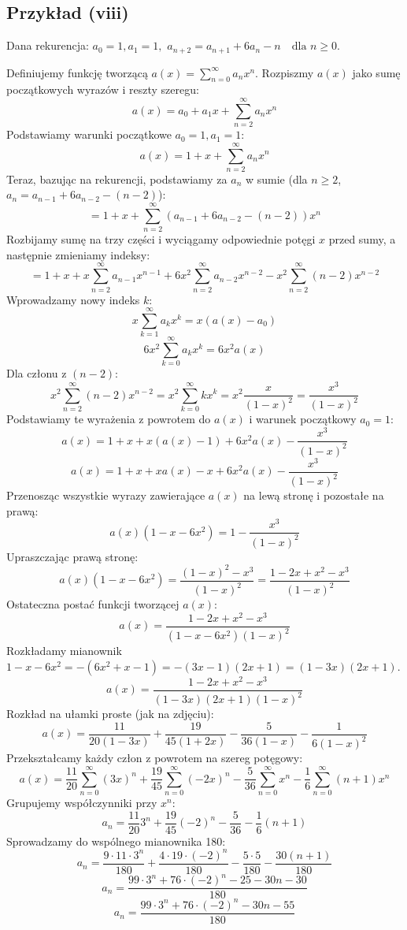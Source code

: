 \documentclass{mwart}
\begin{document}
\begin{mdframed}
    \subsection*{Przykład (viii)}
Dana rekurencja:
$a_0 = 1, a_1 = 1,$
$a_{n+2} = a_{n+1} + 6a_n - n \quad \text{dla } n \ge 0.$

Definiujemy funkcję tworzącą $a(x) = \sum_{n=0}^{\infty} a_n x^n$.
Rozpiszmy $a(x)$ jako sumę początkowych wyrazów i reszty szeregu:
$$ a(x) = a_0 + a_1 x + \sum_{n=2}^{\infty} a_n x^n $$
Podstawiamy warunki początkowe $a_0 = 1, a_1 = 1$:
$$ a(x) = 1 + x + \sum_{n=2}^{\infty} a_n x^n $$
Teraz, bazując na rekurencji, podstawiamy za $a_n$ w sumie (dla $n \ge 2$, $a_n = a_{n-1} + 6a_{n-2} - (n-2)$):
$$ = 1 + x + \sum_{n=2}^{\infty} (a_{n-1} + 6a_{n-2} - (n-2)) x^n $$
Rozbijamy sumę na trzy części i wyciągamy odpowiednie potęgi $x$ przed sumy, a następnie zmieniamy indeksy:
$$ = 1 + x + x \sum_{n=2}^{\infty} a_{n-1} x^{n-1} + 6x^2 \sum_{n=2}^{\infty} a_{n-2} x^{n-2} - x^2 \sum_{n=2}^{\infty} (n-2) x^{n-2} $$
Wprowadzamy nowy indeks $k$:
$$ x \sum_{k=1}^{\infty} a_k x^k = x(a(x) - a_0) $$
$$ 6x^2 \sum_{k=0}^{\infty} a_k x^k = 6x^2 a(x) $$
Dla członu z $(n-2)$:
$$ x^2 \sum_{n=2}^{\infty} (n-2) x^{n-2} = x^2 \sum_{k=0}^{\infty} k x^k = x^2 \frac{x}{(1-x)^2} = \frac{x^3}{(1-x)^2} $$
Podstawiamy te wyrażenia z powrotem do $a(x)$ i warunek początkowy $a_0=1$:
$$ a(x) = 1 + x + x(a(x) - 1) + 6x^2 a(x) - \frac{x^3}{(1-x)^2} $$
$$ a(x) = 1 + x + x a(x) - x + 6x^2 a(x) - \frac{x^3}{(1-x)^2} $$
Przenosząc wszystkie wyrazy zawierające $a(x)$ na lewą stronę i pozostałe na prawą:
$$ a(x) (1 - x - 6x^2) = 1 - \frac{x^3}{(1-x)^2} $$
Upraszczając prawą stronę:
$$ a(x) (1 - x - 6x^2) = \frac{(1-x)^2 - x^3}{(1-x)^2} = \frac{1 - 2x + x^2 - x^3}{(1-x)^2} $$
Ostateczna postać funkcji tworzącej $a(x)$:
$$ a(x) = \frac{1 - 2x + x^2 - x^3}{(1 - x - 6x^2)(1-x)^2} $$
Rozkładamy mianownik $1 - x - 6x^2 = -(6x^2+x-1) = -(3x-1)(2x+1) = (1-3x)(2x+1)$.
$$ a(x) = \frac{1 - 2x + x^2 - x^3}{(1-3x)(2x+1)(1-x)^2} $$
Rozkład na ułamki proste (jak na zdjęciu):
$$ a(x) = \frac{11}{20(1-3x)} + \frac{19}{45(1+2x)} - \frac{5}{36(1-x)} - \frac{1}{6(1-x)^2} $$
Przekształcamy każdy człon z powrotem na szereg potęgowy:
$$ a(x) = \frac{11}{20} \sum_{n=0}^{\infty} (3x)^n + \frac{19}{45} \sum_{n=0}^{\infty} (-2x)^n - \frac{5}{36} \sum_{n=0}^{\infty} x^n - \frac{1}{6} \sum_{n=0}^{\infty} (n+1)x^n $$
Grupujemy współczynniki przy $x^n$:
$$ a_n = \frac{11}{20} 3^n + \frac{19}{45} (-2)^n - \frac{5}{36} - \frac{1}{6}(n+1) $$
Sprowadzamy do wspólnego mianownika 180:
$$ a_n = \frac{9 \cdot 11 \cdot 3^n}{180} + \frac{4 \cdot 19 \cdot (-2)^n}{180} - \frac{5 \cdot 5}{180} - \frac{30(n+1)}{180} $$
$$ a_n = \frac{99 \cdot 3^n + 76 \cdot (-2)^n - 25 - 30n - 30}{180} $$
$$ a_n = \frac{99 \cdot 3^n + 76 \cdot (-2)^n - 30n - 55}{180} $$


\end{mdframed}
\end{document}
